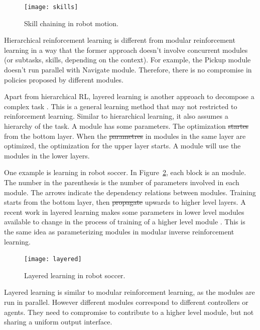 \documentclass[12pt]{report}	%
\theoremstyle{definition}
\theoremstyle{remark}
\providecommand{\DIFadd}[1]{{\protect\color{blue}\uwave{#1}}} %
\providecommand{\DIFdel}[1]{{\protect\color{red}\sout{#1}}}                      %
\providecommand{\DIFaddbegin}{} %
\providecommand{\DIFaddend}{} %
\providecommand{\DIFdelbegin}{} %
\providecommand{\DIFdelend}{} %
\begin{document}
\begin{figure}[h]
\centering
\texttt{[image: skills]}
\caption{Skill chaining in robot motion.}
\label{fig:skills}
\end{figure}

Hierarchical reinforcement learning is different from modular reinforcement
learning in a way that the former approach doesn't involve concurrent modules
(or subtasks, skills, depending on the context).
For example, the Pickup module doesn't run parallel with Navigate module.
Therefore, there is no compromise in policies proposed by different modules.

Apart from hierarchical RL, layered learning is another approach to decompose a
complex task \cite{stone2000layered}. This is a general learning method that may
not \DIFaddbegin \DIFadd{be }\DIFaddend restricted to reinforcement learning. Similar to hierarchical learning, it
also assumes a hierarchy of the task. A module has some parameters. The
optimization \DIFdelbegin \DIFdel{startes }\DIFdelend \DIFaddbegin \DIFadd{starts }\DIFaddend from the bottom layer. When the \DIFdelbegin \DIFdel{parametres }\DIFdelend \DIFaddbegin \DIFadd{parameters }\DIFaddend in modules in
the same layer are optimized, the optimization for the upper layer starts. A
module will use the modules in the lower layers.

One example is learning in robot soccer. In Figure~\ref{fig:soccer}, each block
is an module. The number in the parenthesis is the number of parameters involved
in each module. The arrows indicate the dependency relations between modules.
Training starts from the bottom layer, then \DIFdelbegin \DIFdel{propagate }\DIFdelend \DIFaddbegin \DIFadd{propagates }\DIFaddend upwards to higher level
layers.
A recent work in layered learning makes some parameters in lower level modules
available to change in the process of training of a higher level module
\cite{macalpine2015ut}. This is the same idea as parameterizing modules in
modular inverse reinforcement learning. 

\begin{figure}[h]
\centering
\texttt{[image: layered]}
\caption{Layered learning in robot soccer. \cite{macalpine2015ut}}
\label{fig:soccer}
\end{figure}

Layered learning is similar to modular reinforcement learning, as the modules are
run in parallel. However different modules correspond to different controllers
or agents. They need to compromise to contribute to a higher level module, but
not sharing a uniform output interface.
\end{document}
